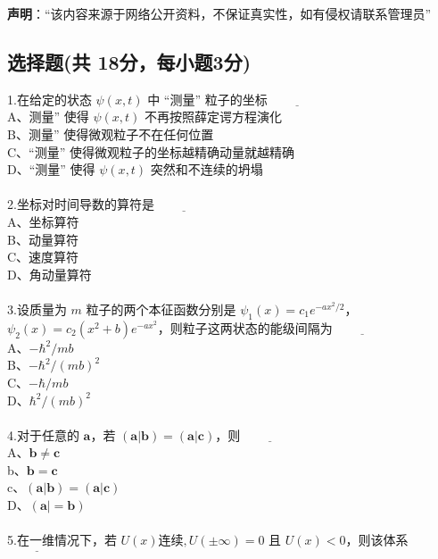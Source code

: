 
\textbf{声明}：“该内容来源于网络公开资料，不保证真实性，如有侵权请联系管理员”

\subsection{选择题(共 18分，每小题3分)}

1.在给定的状态 $\psi(x,t)$ 中 “测量” 粒子的坐标$\underline{\hspace{2cm}}$\\
    A、测量” 使得 $\psi(x,t)$ 不再按照薛定谔方程演化\\
    B、测量” 使得微观粒子不在任何位置\\
    C、“测量” 使得微观粒子的坐标越精确动量就越精确\\
    D、“测量” 使得 $\psi(x,t)$ 突然和不连续的坍塌\\\\
2.坐标对时间导数的算符是$\underline{\hspace{2cm}}$\\
    A、坐标算符 \\
    B、动量算符 \\
    C、速度算符 \\
    D、角动量算符\\\\
3.设质量为 $m$ 粒子的两个本征函数分别是 $\psi_1(x) = c_1e^{-ax^2/2}$，$\psi_2(x) = c_2(x^2+b)e^{-ax^2}$，则粒子这两状态的能级间隔为$\underline{\hspace{2cm}}$\\
    A、$-\hbar^2/mb$\\
    B、$-\hbar^2/(mb)^2$\\
    C、$-\hbar/mb$\\
    D、$\hbar^2/(mb)^2$\\\\
4.对于任意的 $\mathbf{a}$，若 $(\mathbf{a}|\mathbf{b}) = (\mathbf{a}|\mathbf{c})$，则$\underline{\hspace{2cm}}$\\
    A、$\mathbf{b} \ne \mathbf{c}$\\
    b、$\mathbf{b} = \mathbf{c}$\\
    c、$(\mathbf{a}| \mathbf{b}) = (\mathbf{a}| \mathbf{c})$\\
    D、$(\mathbf{a}| = \mathbf{b})$\\\\
5.在一维情况下，若 $U(x) \text{连续}, U(\pm \infty) = 0$ 且 $U(x) < 0$，则该体系$\underline{\hspace{2cm}}$\\\\
